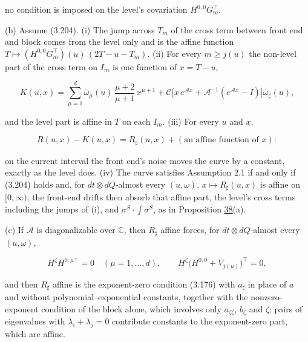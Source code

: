 \documentclass[11pt]{article}
\begin{document}
no condition is imposed on the level's covariation \(H^{0,0}G_m^\top\).

(b) Assume (3.204). (i) The jump across \(T_m\) of the cross term between front end and block comes from the level only and is the affine function \(T\mapsto(H^{0,0}G_m^\top)(u)\,(2T-u-T_m)\). (ii) For every \(m\ge j(u)\) the non-level part of the cross term on \(I_m\) is one function of \(x=T-u\),

\begin{equation*}
K(u,x)=\sum_{\mu=1}^d\bar\omega_\mu(u)\,\frac{\mu+2}{\mu+1}\,x^{\mu+1}+\mathcal C\bigl[x\,e^{\mathcal Ax}+\mathcal A^{-1}(e^{\mathcal Ax}-I)\bigr]\bar\omega_\zeta(u), \tag{3.205}\label{eq:3.205}
\end{equation*}

and the level part is affine in \(T\) on each \(I_m\). (iii) For every \(u\) and \(x\),

\begin{equation*}
R(u,x)-K(u,x)=R_\sharp(u,x)+(\text{an affine function of }x): \tag{3.206}\label{eq:3.206}
\end{equation*}

on the current interval the front end's noise moves the curve by a constant, exactly as the level does. (iv) The curve satisfies Assumption 2.1 if and only if (3.204) holds and, for \(dt\otimes dQ\)-almost every \((u,\omega)\), \(x\mapsto R_\sharp(u,x)\) is affine on \([0,\infty)\); the front-end drifts then absorb that affine part, the level's cross terms including the jumps of (i), and \(\sigma^S\cdot\int\sigma^S\), as in Proposition \hyperref[res:Proposition-38]{38}(a).

(c) If \(\mathcal A\) is diagonalizable over \(\mathbb C\), then \(R_\sharp\) affine forces, for \(dt\otimes dQ\)-almost every \((u,\omega)\),

\begin{equation*}
H^\zeta H^{0,\mu\top}=0\quad(\mu=1,\dots,d),\qquad H^\zeta\bigl(H^{0,0}+V_{j(u)}\bigr)^\top=0, \tag{3.207}\label{eq:3.207}
\end{equation*}

and then \(R_\sharp\) affine is the exponent-zero condition (3.176) with \(a_\sharp\) in place of \(a\) and without polynomial--exponential constants, together with the nonzero-exponent condition of the block alone, which involves only \(a_{\zeta\zeta}\), \(b_\zeta\) and \(\zeta\); pairs of eigenvalues with \(\lambda_i+\lambda_j=0\) contribute constants to the exponent-zero part, which are affine.
\end{document}
